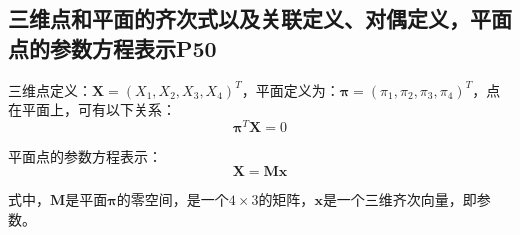 \documentclass[11pt]{article}
\begin{document}
\subsection{三维点和平面的齐次式以及关联定义、对偶定义，平面点的参数方程表示P50}
三维点定义：$\mathbold{X}=(X_1,X_2,X_3,X_4)^T$，平面定义为：$\mathbold{\pi}=(\pi_1,\pi_2,\pi_3,\pi_4)^T$，点在平面上，可有以下关系：
\begin{equation*}
  \mathbold{\pi}^T\mathbold{X}=0
\end{equation*}\par
平面点的参数方程表示：
\begin{equation*}
  \mathbold{X}=\mathbold{Mx}
\end{equation*}\par
式中，$\mathbold{M}$是平面$\mathbold{\pi}$的零空间，是一个$4\times3$的矩阵，$\mathbold{x}$是一个三维齐次向量，即参数。
\end{document}
